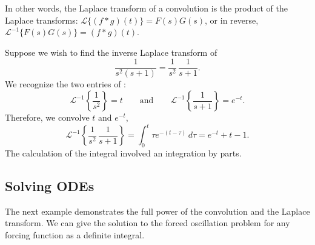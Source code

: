 In other words, the Laplace transform of a convolution is the product
of the Laplace transforms:
${\mathcal{L}} \bigl\{ (f*g)(t) \bigr\} = F(s)G(s)$,
or in reverse,
${\mathcal{L}}^{-1} \bigl\{ F(s) G(s) \bigr\} = (f*g)(t)$.

\begin{example}
Suppose we wish to find the inverse Laplace transform of
\begin{equation*}
\frac{1}{s^2(s+1)} = 
\frac{1}{s^2}
\,
\frac{1}{s+1}
.
\end{equation*}
We recognize the two entries of :
\begin{equation*}
\mathcal{L}^{-1} 
\left\{
\frac{1}{s^2} \right\} 
= t
\qquad \text{and} \qquad
\mathcal{L}^{-1} 
\left\{
\frac{1}{s+1} \right\}
= e^{-t}
.
\end{equation*}
Therefore, we convolve $t$ and $e^{-t}$,
\begin{equation*}
\mathcal{L}^{-1}
\left\{
\frac{1}{s^2}
\,
\frac{1}{s+1}
\right\}
=
\int_0^t
\tau e^{-(t-\tau)} \,d\tau
=
e^{-t}+t-1 .
\end{equation*}
The calculation of the integral involved an integration by parts.
\end{example}

\subsection{Solving ODEs}

The next example demonstrates the full power of the convolution and
the Laplace transform.  We can give the solution to
the forced oscillation problem for any forcing function as a definite
integral.

